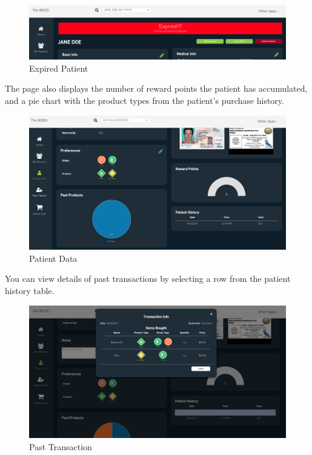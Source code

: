 \documentclass[]{book}
\theoremstyle{definition}
\theoremstyle{definition}
\theoremstyle{definition}
\theoremstyle{remark}
\begin{document}
\begin{figure}
\centering
\includegraphics{images/expired.png}
\caption{Expired Patient}
\end{figure}

The page also displays the number of reward points the patient has
accumulated, and a pie chart with the product types from the patient's
purchase history.

\begin{figure}
\centering
\includegraphics{images/patientInfo2.png}
\caption{Patient Data}
\end{figure}

You can view details of past transactions by selecting a row from the
patient history table.

\begin{figure}
\centering
\includegraphics{images/pastTransaction.png}
\caption{Past Transaction}
\end{figure}
\end{document}
